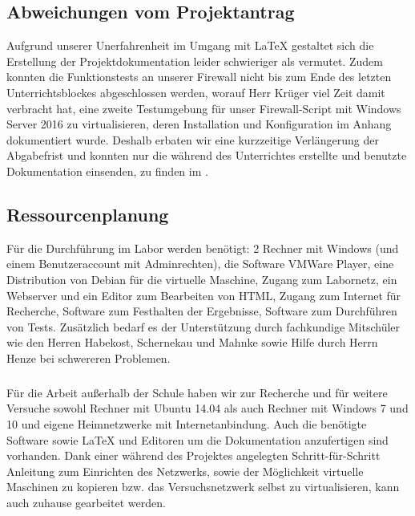 \subsection{Abweichungen vom Projektantrag}
\label{sec:AbweichungenProjektantrag}

Aufgrund unserer Unerfahrenheit im Umgang mit \LaTeX{} gestaltet sich die Erstellung der Projektdokumentation leider schwieriger als vermutet. Zudem konnten die Funktionstests an unserer Firewall nicht bis zum Ende des letzten Unterrichtsblockes abgeschlossen werden, worauf Herr Krüger viel Zeit damit verbracht hat, eine zweite Testumgebung für unser Firewall-Script mit Windows Server 2016 zu virtualisieren, deren Installation und Konfiguration im Anhang dokumentiert wurde. Deshalb erbaten wir  eine kurzzeitige Verlängerung der Abgabefrist und konnten nur die während des Unterrichtes erstellte und benutzte Dokumentation einsenden, zu finden im .

\subsection{Ressourcenplanung}
\label{sec:Ressourcenplanung}

Für die Durchführung im Labor werden benötigt: 2 Rechner mit Windows (und einem Benutzeraccount mit Adminrechten), die Software VMWare Player, eine Distribution von Debian für die virtuelle Maschine, Zugang zum Labornetz, ein Webserver und ein Editor zum Bearbeiten von HTML, Zugang zum Internet für Recherche, Software zum Festhalten der Ergebnisse, Software zum Durchführen von Tests. Zusätzlich bedarf es der Unterstützung durch fachkundige Mitschüler wie den Herren Habekost, Schernekau und Mahnke sowie Hilfe durch Herrn Henze bei schwereren Problemen.
\subparagraph*{} Für die Arbeit außerhalb der Schule haben wir zur Recherche und für weitere Versuche sowohl Rechner mit Ubuntu 14.04 als auch Rechner mit Windows 7 und 10 und eigene Heimnetzwerke mit Internetanbindung. Auch die benötigte Software sowie \LaTeX{} und Editoren um die Dokumentation anzufertigen sind vorhanden. Dank einer während des Projektes angelegten Schritt-für-Schritt Anleitung zum Einrichten des Netzwerks, sowie der Möglichkeit virtuelle Maschinen zu kopieren bzw. das Versuchsnetzwerk selbst zu virtualisieren, kann auch zuhause gearbeitet werden.

